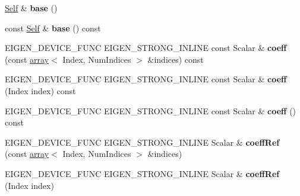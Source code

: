 \begin{DoxyCompactItemize}
\hyperlink{class_eigen_1_1_tensor_fixed_size}{Self} \& {\bfseries base} ()
\item 
\mbox{\label{class_eigen_1_1_tensor_fixed_size_a23c06e6c763faa169dd257a3a6a4328e}} 
const \hyperlink{class_eigen_1_1_tensor_fixed_size}{Self} \& {\bfseries base} () const
\item 
\mbox{\label{class_eigen_1_1_tensor_fixed_size_aebf8e4efbc8adcd152aa2e45050f5742}} 
E\+I\+G\+E\+N\+\_\+\+D\+E\+V\+I\+C\+E\+\_\+\+F\+U\+NC E\+I\+G\+E\+N\+\_\+\+S\+T\+R\+O\+N\+G\+\_\+\+I\+N\+L\+I\+NE const Scalar \& {\bfseries coeff} (const \hyperlink{class_eigen_1_1array}{array}$<$ Index, Num\+Indices $>$ \&indices) const
\item 
\mbox{\label{class_eigen_1_1_tensor_fixed_size_ae29800f72960268b61181ac802ff293a}} 
E\+I\+G\+E\+N\+\_\+\+D\+E\+V\+I\+C\+E\+\_\+\+F\+U\+NC E\+I\+G\+E\+N\+\_\+\+S\+T\+R\+O\+N\+G\+\_\+\+I\+N\+L\+I\+NE const Scalar \& {\bfseries coeff} (Index index) const
\item 
\mbox{\label{class_eigen_1_1_tensor_fixed_size_a0422691e7495467f239e55fefe0f66dd}} 
E\+I\+G\+E\+N\+\_\+\+D\+E\+V\+I\+C\+E\+\_\+\+F\+U\+NC E\+I\+G\+E\+N\+\_\+\+S\+T\+R\+O\+N\+G\+\_\+\+I\+N\+L\+I\+NE const Scalar \& {\bfseries coeff} () const
\item 
\mbox{\label{class_eigen_1_1_tensor_fixed_size_a8659b7903814031122c82690cc7c010b}} 
E\+I\+G\+E\+N\+\_\+\+D\+E\+V\+I\+C\+E\+\_\+\+F\+U\+NC E\+I\+G\+E\+N\+\_\+\+S\+T\+R\+O\+N\+G\+\_\+\+I\+N\+L\+I\+NE Scalar \& {\bfseries coeff\+Ref} (const \hyperlink{class_eigen_1_1array}{array}$<$ Index, Num\+Indices $>$ \&indices)
\item 
\mbox{\label{class_eigen_1_1_tensor_fixed_size_a025b2fc02f00f9b3a100e85eddc59ca9}} 
E\+I\+G\+E\+N\+\_\+\+D\+E\+V\+I\+C\+E\+\_\+\+F\+U\+NC E\+I\+G\+E\+N\+\_\+\+S\+T\+R\+O\+N\+G\+\_\+\+I\+N\+L\+I\+NE Scalar \& {\bfseries coeff\+Ref} (Index index)
\item 
\mbox{\label{class_eigen_1_1_tensor_fixed_size_a137e21057f64825af9e238b73899a744}} 

\end{DoxyCompactItemize}
